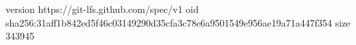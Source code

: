 version https://git-lfs.github.com/spec/v1
oid sha256:31aff1b842ed5f46c03149290d35cfa3c78e6a9501549e956ae19a71a447f354
size 343945
